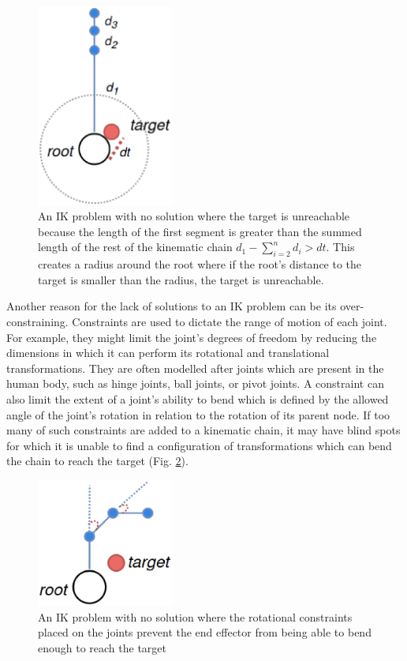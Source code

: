 \begin{figure}
    \centering
    \captionsetup{justification=centering}
    \includegraphics[width=0.4\textwidth]{grafika/unreachable_dist_2.eps}
    \caption{An IK problem with no solution where the target is unreachable
    because the length of the first segment is greater than the summed length of
    the rest of the kinematic chain \(d_1 - \sum_{i=2}^{n}d_i > dt\). This creates
    a radius around the root where if the root's distance to the target is
    smaller than the radius, the target is unreachable.
} \label{fig:unreachable_dist2}
\end{figure}

Another reason for the lack of solutions to an IK problem can be its
over-constraining. Constraints are used to dictate the range of motion of
each joint. For example, they might limit the joint's degrees of freedom by
reducing the dimensions in which it can perform its rotational and translational
transformations. They are often modelled after joints which are present in the
human body, such as hinge joints, ball joints, or pivot joints. A constraint can
also limit the extent of a joint's ability to bend which is defined by the
allowed angle of the joint's rotation in relation to the rotation of its parent
node. If too many of such constraints are added to a kinematic chain, it may
have blind spots for which it is unable to find a configuration of
transformations which can bend the chain to reach the target (Fig.
\ref{fig:unreachable_angles}).

\begin{figure}
    \centering
    \captionsetup{justification=centering}
    \includegraphics[width=0.4\textwidth]{grafika/unreachable_angles.eps}
    \caption{An IK problem with no solution where the rotational constraints
    placed on the joints prevent the end effector from being able to bend enough
    to reach the target}
    \label{fig:unreachable_angles}
\end{figure}

